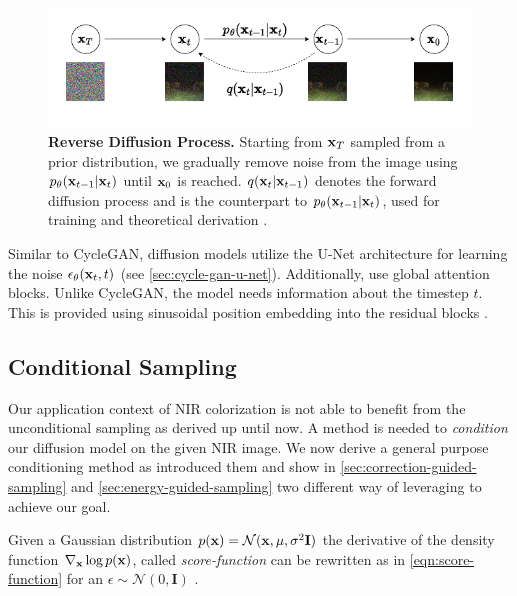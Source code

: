 \begin{figure}[htp!]
   \centering
   \includegraphics[width=.8\textwidth]{gfx/Unconditional-Sampling.pdf}
   \caption{
      \textbf{Reverse Diffusion Process.}
      Starting from $\mathbf{x}_T$ sampled from a prior distribution, we gradually remove noise from the image using $p_\theta(\mathbf{x}_{t-1}|\mathbf{x}_t)$ until $\mathbf{x}_0$ is reached.
      $q(\mathbf{x}_t | \mathbf{x}_{t-1})$ denotes the forward diffusion process and is the counterpart to $p_\theta(\mathbf{x}_{t-1}|\mathbf{x}_t)$, used for training and theoretical derivation \parencite{ddpm}.
   }
   \label{fig:reverse-diffusion-process}
\end{figure}



Similar to CycleGAN, diffusion models utilize the U-Net architecture for learning the noise $\epsilon_\theta(\mathbf{x}_t,t)$ \parencite{unet,mehri,ddpm,diffusion-beats-gans} (see \autoref{sec:cycle-gan-u-net}).
Additionally, \cite{diffusion-beats-gans} use global attention blocks.  
Unlike CycleGAN, the model needs information about the timestep $t$. This is provided using sinusoidal position embedding into the residual blocks \parencite{ddpm}.

\subsection{Conditional Sampling}
\label{sec:conditional-sampling}
Our application context of NIR colorization is not able to benefit from the unconditional sampling as derived up until now.
A method is needed to \textit{condition} our diffusion model on the given NIR image.
We now derive a general purpose conditioning method as \textcite{sbgm,diffusion-beats-gans} introduced them and show in \autoref{sec:correction-guided-sampling} and \autoref{sec:energy-guided-sampling}
two different way of leveraging to achieve our goal.

Given a Gaussian distribution $p(\mathbf{x}) = \mathcal{N}(\mathbf{x}, \mu, \sigma^2 \mathbf{I})$ the derivative of the density function $\nabla_{\mathbf{x}} \log p(\mathbf{x})$, called \textit{score-function} can be rewritten as in \autoref{eqn:score-function} for an $\epsilon \sim \mathcal{N}(0, \mathbf{I})$ \parencite{sbgm}.

